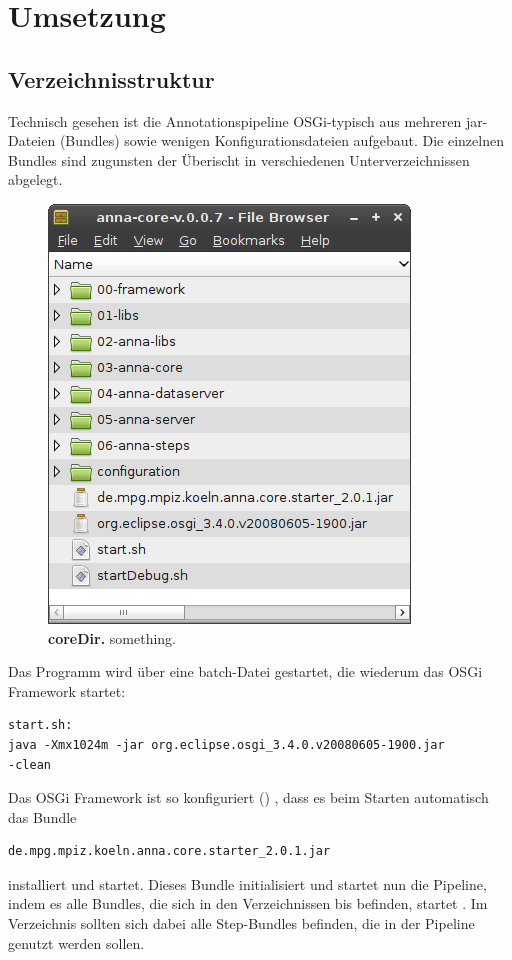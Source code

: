 \chapter{Umsetzung}
\todo{\dots}





\section{Verzeichnisstruktur}
Technisch gesehen ist die Annotationspipeline OSGi-typisch aus
mehreren jar-Dateien (Bundles) sowie wenigen Konfigurationsdateien aufgebaut.
Die einzelnen Bundles sind zugunsten der Überischt in verschiedenen
Unterverzeichnissen abgelegt.

\begin{figure}[htbp]
	\begin{center}
		\includegraphics[scale=0.7]{pics/coreDir.png}
	\caption[coreDir]{
	\textbf{coreDir.}
	something.}
	\end{center}
	\label{fig:coreDir}
\end{figure}

Das Programm wird über eine batch-Datei gestartet,
die wiederum das OSGi Framework startet:
\begin{verbatim}
start.sh:
java -Xmx1024m -jar org.eclipse.osgi_3.4.0.v20080605-1900.jar
-clean\end{verbatim}
Das OSGi Framework ist so konfiguriert ()
, dass es beim Starten automatisch das Bundle
\begin{verbatim}
de.mpg.mpiz.koeln.anna.core.starter_2.0.1.jar
\end{verbatim}
installiert und startet.
Dieses Bundle initialisiert und startet nun die Pipeline, indem es alle Bundles,
die sich in den Verzeichnissen  bis  befinden, startet
. Im Verzeichnis  sollten sich dabei
alle Step-Bundles befinden, die in der Pipeline genutzt werden sollen.

